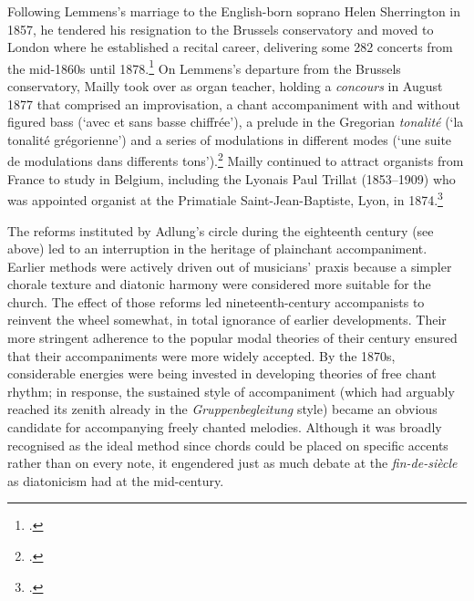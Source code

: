 Following Lemmens's marriage to the English-born soprano Helen Sherrington in 1857, he tendered his resignation to the Brussels conservatory and moved to London where he established a recital career, delivering some 282 concerts from the mid-1860s until 1878.\footcites[57]{FocquaertAspectsJacquesNicolasLemmens2013}[50--51]{FocquaertJacquesNicolasLemmensBelgische2014}
On Lemmens's departure from the Brussels conservatory, Mailly took over as organ teacher, holding a \emph{concours} in August 1877 that comprised an improvisation, a chant accompaniment with and without figured bass (`avec et sans basse chiffrée'), a prelude in the Gregorian \emph{tonalité} (`la tonalité grégorienne') and a series of modulations in different modes (`une suite de modulations dans differents tons').\footcites[294]{JouretConcoursconservatoireroyal1877}[Cited in][171]{OchseOrganistsOrganPlaying2000}
Mailly continued to attract organists from France to study in Belgium, including the Lyonais Paul Trillat (1853--1909) who was appointed organist at the Primatiale Saint-Jean-Baptiste, Lyon, in 1874.\footcite[9]{EmeryEnnemondTrillatmusicien1979}
\nowidow[2]

The reforms instituted by Adlung's circle during the eighteenth century (see  above) led to an interruption in the heritage of plainchant accompaniment.
Earlier methods were actively driven out of musicians' praxis because a simpler chorale texture and diatonic harmony were considered more suitable for the church.
The effect of those reforms led nineteenth-century accompanists to reinvent the wheel somewhat, in total ignorance of earlier developments.
Their more stringent adherence to the popular modal theories of their century ensured that their accompaniments were more widely accepted.
By the 1870s, considerable energies were being invested in developing theories of free chant rhythm; in response, the sustained style of accompaniment (which had arguably reached its zenith already in the \emph{Gruppenbegleitung} style) became an obvious candidate for accompanying freely chanted melodies.
Although it was broadly recognised as the ideal method since chords could be placed on specific accents rather than on every note, it engendered just as much debate at the \emph{fin-de-siècle} as diatonicism had at the mid-century.
